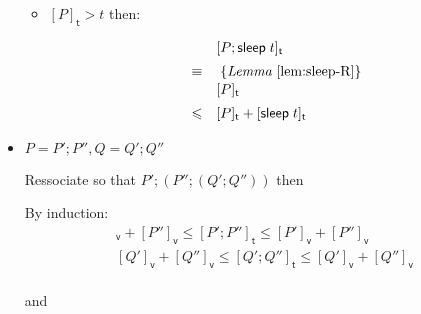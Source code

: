 \documentclass[preprint]{sigplanconf}
\renewcommand{\leq}{\leqslant}
\newcommand{\note}[1]{{\color{blue}{#1}}}
\theoremstyle{definition}
\newcommand{\sleep}{\mathsf{sleep}\;}
\newcommand{\vtime}[1]{[#1]_{\mathsf{v}}}
\newcommand{\etime}[1]{[#1]_{\mathsf{t}}}
\begin{document}
\begin{itemize}
\begin{itemize}
\item $\etime{P} > t$ then:

\begin{align*}
\begin{array}{ll}
       & \etime{P; \sleep t} \\[0.5em]
\equiv & \; \{\textit{Lemma}~\ref{lem:sleep-R}\} \\[0.1em]
       & \etime{P} \\[0.5em]
\leq   & \etime{P} + \etime{\sleep t}
\end{array}
\end{align*}

\end{itemize}

\item $P = P';P'', Q = Q';Q''$

Ressociate so that $P'; (P''; (Q'; Q''))$ then

By induction:
\begin{align}
\vtime{P'} + \vtime{P''} \leq \etime{P'; P''} \leq \vtime{P'} + \vtime{P''} \\
\vtime{Q'} + \vtime{Q''} \leq \etime{Q'; Q''} \leq \vtime{Q'} + \vtime{Q''} \\
\end{align}

and
\note{STUCK!}
\end{itemize}
\end{document}
